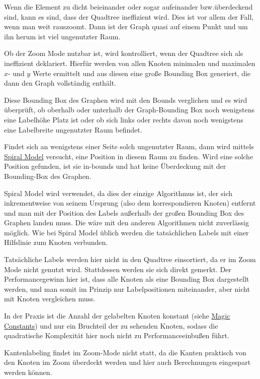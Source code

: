 
Wenn die Element zu dicht beieinander oder sogar aufeinander bzw.überdeckend sind, kann es sind, dass der Quadtree ineffizient wird.
Dies ist vor allem der Fall, wenn man weit rauszoomt.
Dann ist der Graph quasi auf einem Punkt und um ihn herum ist viel ungenutzter Raum.

Ob der Zoom Mode nutzbar ist, wird kontrolliert, wenn der Quadtree sich als ineffizient deklariert.
Hierfür werden von allen Knoten minimalen und maximalen $x$- und $y$ Werte ermittelt und
aus diesen eine große Bounding Box generiert, die dann den Graph vollständig enthält.

Diese Bounding Box des Graphen wird mit den Bounds verglichen und es wird überprüft, ob
oberhalb oder unterhalb der Graph-Bounding Box noch wenigstens eine Labelhöhe Platz ist oder
ob sich links oder rechts davon noch wenigstens eine Labelbreite ungenutzter Raum befindet.

Findet sich an wenigstens einer Seite solch ungenutzter Raum, dann wird mittels \hyperref[subsubsec:spiral]{Spiral Model} versucht, eine Position in diesem Raum zu finden.
Wird eine solche Position gefunden, ist sie in-bounds und hat keine Überdeckung mit der Bounding-Box des Graphen.

Spiral Model wird verwendet, da dies der einzige Algorithmus ist, der sich inkrementweise von seinem Ursprung (also dem korrespondieren Knoten) entfernt und man mit der Position des Labels
außerhalb der großen Bounding Box des Graphen landen muss.
Die wäre mit den anderen Algorithmen nicht zuverlässig möglich.
Wie bei Spiral Model üblich werden die tatsächlichen Labels mit einer Hilfslinie zum Knoten verbunden.

Tatsächliche Labels werden hier nicht in den Quadtree einsortiert, da er im Zoom Mode nicht genutzt wird. Stattdessen werden sie sich direkt gemerkt.
Der Performancegewinn hier ist, dass alle Knoten als eine Bounding Box dargestellt werden, und man somit im Prinzip nur Labelpositionen miteinander, aber nicht mit Knoten vergleichen muss.

In der Praxis ist die Anzahl der gelabelten Knoten konstant (siehe \hyperref[subsec:consts]{Magic Constants}) und nur ein Bruchteil der zu sehenden Knoten,
sodass die quadratische Komplexität hier noch nicht zu Performanceeinbußen führt.

Kantenlabeling findet im Zoom-Mode nicht statt, da die Kanten praktisch von den Knoten im Zoom überdeckt werden und hier auch Berechnungen eingespart werden können.

